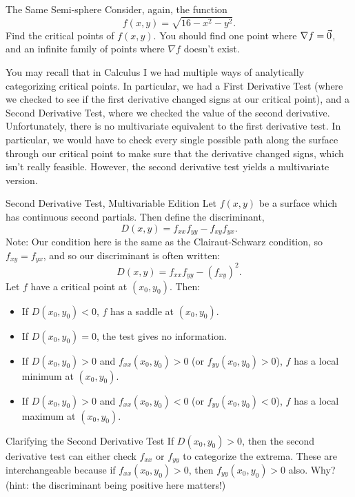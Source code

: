 \begin{exercise}{The Same Semi-sphere}
Consider, again, the function $$f(x,y)=\sqrt{16-x^2-y^2}.$$
Find the critical points of $f(x,y)$. You should find one point where $\nabla f=\vec{0}$, and an infinite family of points where $\nabla f$ doesn't exist.
\end{exercise}

You may recall that in Calculus I we had multiple ways of analytically categorizing critical points. In particular, we had a First Derivative Test (where we checked to see if the first derivative changed signs at our critical point), and a Second Derivative Test, where we checked the value of the second derivative. Unfortunately, there is no multivariate equivalent to the first derivative test. In particular, we would have to check every single possible path along the surface through our critical point to make sure that the derivative changed signs, which isn't really feasible. However, the second derivative test yields a multivariate version.

\begin{definition}{Second Derivative Test, Multivariable Edition}
Let $f(x,y)$ be a surface which has continuous second partials. Then define the discriminant, $$D(x,y)=f_{xx}f_{yy}-f_{xy}f_{yx}.$$ Note: Our condition here is the same as the Clairaut-Schwarz condition, so $f_{xy}=f_{yx}$, and so our discriminant is often written: $$D(x,y)=f_{xx}f_{yy}-(f_{xy})^2.$$ Let $f$ have a critical point at $(x_0,y_0)$. Then:
\vspace{1em}
\begin{itemize}
\item If $D(x_0,y_0)<0$, $f$ has a saddle at $(x_0,y_0)$.
\vspace{1em}
\item If $D(x_0,y_0)=0$, the test gives no information.
\vspace{1em}
\item If $D(x_0,y_0)>0$ and $f_{xx}(x_0,y_0)>0$ (or $f_{yy}(x_0,y_0)>0$), $f$ has a local minimum at $(x_0,y_0)$.
\vspace{1em}
\item If $D(x_0,y_0)>0$ and $f_{xx}(x_0,y_0)<0$ (or $f_{yy}(x_0,y_0)<0$), $f$ has a local maximum at $(x_0,y_0)$.
\end{itemize}
\end{definition}

\begin{exercise}{Clarifying the Second Derivative Test}
If $D(x_0,y_0)>0$, then the second derivative test can either check $f_{xx}$ or $f_{yy}$ to categorize the extrema. These are interchangeable because if $f_{xx}(x_0,y_0)>0$, then $f_{yy}(x_0,y_0)>0$ also. Why? (hint: the discriminant being positive here matters!)
\end{exercise}

